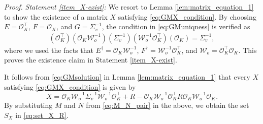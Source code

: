 \documentclass{ifacconf}
\newcommand{\calO}{\ensuremath{\mathcal{O}}}
\newcommand{\calW}{\ensuremath{\mathcal{W}}}
\newcommand{\+}{\mathsmaller{+}}
\begin{document}
\textit{Proof.}
%
%
%
	 	\textit{Statement \ref{item_X-exist}:}
We resort to Lemma \ref{lem:matrix_equation_1} to show the existence of a matrix $X$ satisfying \eqref{eq:GMX_condition}. By choosing $E = \calO_K^ \top$, $F = \calO_K$, and $G = \Sigma_v^{-1}$, the condition in \eqref{eq:GMuniqness} is verified as %
	\begin{align*}
	 (\calO_K^ \top)(\calO_K \calW_o^{-1})(\Sigma_v^{-1})(\calW_o^{-1} \calO_K^ \top)(\calO_K) = \Sigma_v^{-1},
	\end{align*}
	where we used the facts that $E^{\dag} = \calO_K \calW_o^{-1}$, $F^{\dag} = \calW_o^{-1} \calO_K^ \top $, and $\calW_o =  \calO_K^ \top \calO_K$. This proves the existence claim in Statement \ref{item_X-exist}.
 
	It follows from \eqref{eq:GMsolution} in Lemma \ref{lem:matrix_equation_1} that
	every $X$ satisfying \eqref{eq:GMX_condition} is given by 
	\[
		X = \calO_K \calW_o^{-1}\Sigma_v^{-1}\calW_o^{-1} \calO_K^ \top + R- \calO_K \calW_o^{-1}\calO_K^ \top R \calO_K\calW_o^{-1} \calO_K^ \top.
	\]	
By substituting $M$ and $N$ from \eqref{eq:M_N_pair} in the above, we obtain the set $S_X$ in \eqref{eq:set_X_R}.
\end{document}
